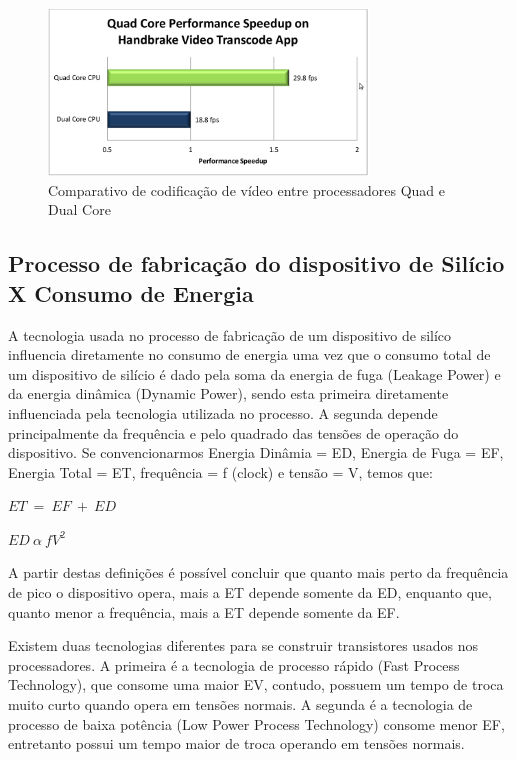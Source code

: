 \documentclass[article]{IEEEtran}
\begin{document}
\begin{figure}[ht]
  \centering
  \includegraphics[width=8.5cm]{./pictures/QuadCoreVideo.png}
  \caption{Comparativo de codifica\c{c}\~ao de v\'ideo entre processadores Quad e Dual Core}
  \label{fig:quadcorevideo}
\end{figure}

\subsection{Processo de fabrica\c{c}\~ao do dispositivo de Sil\'icio X Consumo de Energia}

A tecnologia usada no processo de fabrica\c{c}\~ao de um dispositivo de sil\'ico influencia diretamente no consumo de energia uma vez que o consumo total de um dispositivo de sil\'icio \'e dado pela soma da energia de fuga (Leakage Power) e da energia din\^amica (Dynamic Power), sendo esta primeira diretamente influenciada pela tecnologia utilizada no processo. A segunda depende principalmente da frequ\^encia e pelo quadrado das tens\~oes de opera\c{c}\~ao do dispositivo. Se convencionarmos Energia Din\^amia = ED, Energia de Fuga = EF, Energia Total = ET, frequ\^encia = f (clock) e tens\~ao = V, temos que:
 
\( ET\ =\ EF\ +\ ED \)

\( ED\  \alpha\  fV^2\)
	
A partir destas defini\c{c}\~oes \'e poss\'ivel concluir que quanto mais perto da frequ\^encia de pico o dispositivo opera, mais a ET depende somente da ED, enquanto que, quanto menor a  frequ\^encia, mais a ET depende somente da EF.

Existem duas tecnologias diferentes para se construir transistores usados nos processadores. A primeira \'e a tecnologia de processo r\'apido (Fast Process Technology), que consome uma maior EV, contudo, possuem um tempo de troca muito curto quando opera em tens\~oes normais. A segunda \'e a tecnologia de processo de baixa pot\^encia (Low Power Process Technology) consome menor EF, entretanto possui um tempo maior de troca operando em tens\~oes normais.
\end{document}
